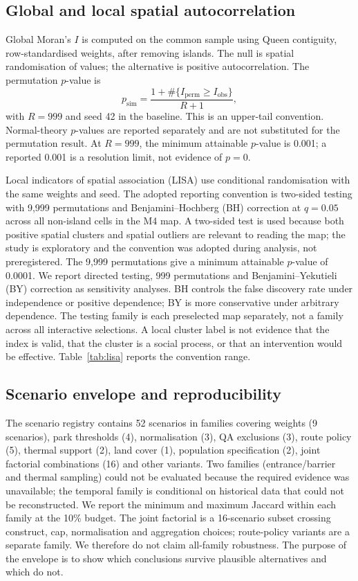 \documentclass[times,twoside]{_Templates/MultiTargetManuscript}
\begin{document}
\subsection{Global and local spatial autocorrelation}

Global Moran's $I$ is computed on the common sample using Queen contiguity,
row-standardised weights, after removing islands. The null is spatial
randomisation of values; the alternative is positive autocorrelation. The
permutation $p$-value is
\begin{equation}
p_{\mathrm{sim}} = \frac{1 + \#\{I_{\mathrm{perm}} \ge I_{\mathrm{obs}}\}}{R+1},
\label{eq:moranp}
\end{equation}
with $R=999$ and seed 42 in the baseline. This is an upper-tail convention.
Normal-theory $p$-values are reported separately and are not substituted for the
permutation result. At $R=999$, the minimum attainable $p$-value is 0.001; a
reported 0.001 is a resolution limit, not evidence of $p=0$.

Local indicators of spatial association (LISA) use conditional randomisation
with the same weights and seed. The adopted reporting convention is two-sided
testing with 9,999 permutations and Benjamini--Hochberg (BH) correction at
$q=0.05$ across all non-island cells in the M4 map. A two-sided test is used
because both positive spatial clusters and spatial outliers are relevant to
reading the map; the study is exploratory and the convention was adopted during
analysis, not preregistered. The 9,999 permutations give a minimum attainable
$p$-value of 0.0001. We report directed testing, 999 permutations and
Benjamini--Yekutieli (BY) correction as sensitivity analyses. BH controls the
false discovery rate under independence or positive dependence; BY is more
conservative under arbitrary dependence. The testing family is each preselected
map separately, not a family across all interactive selections. A local cluster
label is not evidence that the index is valid, that the cluster is a social
process, or that an intervention would be effective. Table~\ref{tab:lisa}
reports the convention range.

\subsection{Scenario envelope and reproducibility}

The scenario registry contains 52 scenarios in families covering weights
(9 scenarios), park thresholds (4), normalisation (3), QA exclusions (3), route
policy (5), thermal support (2), land cover (1), population specification (2),
joint factorial combinations (16) and other variants. Two families
(entrance/barrier and thermal sampling) could not be evaluated because the
required evidence was unavailable; the temporal family is conditional on
historical data that could not be reconstructed. We report the minimum and maximum Jaccard within each
family at the 10\% budget. The joint factorial is a 16-scenario subset crossing
construct, cap, normalisation and aggregation choices; route-policy variants are
a separate family. We therefore do not claim all-family robustness. The purpose
of the envelope is to show which conclusions survive plausible alternatives and
which do not.
\end{document}
